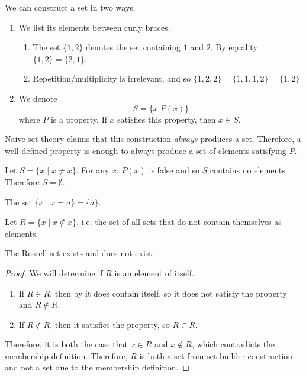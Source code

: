 \begin{definition}
  We can construct a set in two ways. 
  \begin{enumerate}
    \item We list its elements between curly braces. 
    \begin{enumerate}
      \item The set $\{1, 2\}$ denotes the set containing $1$ and $2$. By equality $\{1, 2\} = \{2, 1\}$. 
      \item Repetition/multiplicity is irrelevant, and so $\{1, 2, 2\} = \{1, 1, 1, 2\} = \{1, 2\}$ 
    \end{enumerate} 

    \item We denote 
    \begin{equation}
      S = \{ x | P(x) \}
    \end{equation} 
    where $P$ is a property. If $x$ satisfies this property, then $x \in S$. 
  \end{enumerate}
  Naive set theory claims that this construction \textit{always} produces a set. Therefore, a well-defined property is enough to always produce a set of elements satisfying $P$. 
\end{definition} 

\begin{example}
  Let $S = \{x \mid x \neq x \}$. For any $x$, $P(x)$ is false and so $S$ contains no elements. Therefore $S = \emptyset$. 
\end{example}

\begin{example}
  The set $\{x \mid x = a \} = \{a\}$. 
\end{example}

\begin{example}
  Let $R = \{x \mid x \not\in x\}$, i.e. the set of all sets that do not contain themselves as elements. 
\end{example}

\begin{theorem} 
  The Russell set exists and does not exist. 
\end{theorem}
\begin{proof}
  We will determine if $R$ is an element of itself. 
  \begin{enumerate}
    \item If $R \in R$, then by it does contain itself, so it does not satisfy the property and $R \not\in R$. 
    \item If $R \not\in R$, then it satisfies the property, so $R \in R$. 
  \end{enumerate}
  Therefore, it is both the case that $x \in R$ and $x \not\in R$, which contradicts the membership definition. Therefore, $R$ is both a set from set-builder construction and not a set due to the membership definition. 
\end{proof}

